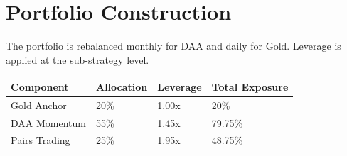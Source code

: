 \documentclass[11pt]{article}
\begin{document}
\section{Portfolio Construction}
The portfolio is rebalanced monthly for DAA and daily for Gold. Leverage is applied at the sub-strategy level.

\begin{table}[h]
\centering
\begin{tabular}{@{}llll@{}}
\toprule
\textbf{Component} & \textbf{Allocation} & \textbf{Leverage} & \textbf{Total Exposure} \\ \midrule
Gold Anchor        & 20\%                & 1.00x             & 20\%                   \\
DAA Momentum       & 55\%                & 1.45x             & 79.75\%                \\
Pairs Trading      & 25\%                & 1.95x             & 48.75\%                \\ \bottomrule
\end{tabular}
\end{table}
\end{document}
